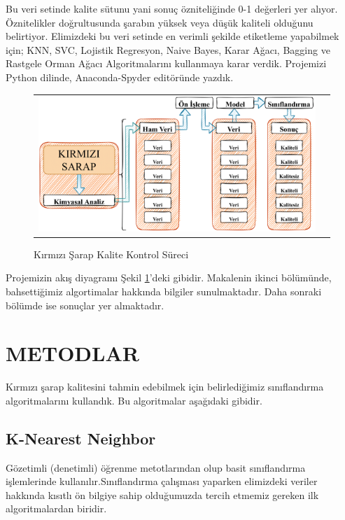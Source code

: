 \documentclass[conference]{IEEEtran}
\begin{document}
\quad Bu veri setinde kalite sütunu yani sonuç özniteliğinde 0-1 değerleri yer alıyor. Öznitelikler doğrultusunda şarabın yüksek veya düşük kaliteli olduğunu belirtiyor. Elimizdeki bu veri setinde en verimli şekilde etiketleme yapabilmek için; KNN, SVC, Lojistik Regresyon, Naive Bayes, Karar Ağacı, Bagging ve Rastgele Orman Ağacı Algoritmalarını kullanmaya karar verdik. Projemizi Python dilinde, Anaconda-Spyder editöründe yazdık.
\pagebreak
\begin{figure}[!h]
	\centering%
	\begin{center}
		\begin{tabular}{cc}%
			\includegraphics[scale=0.2]{pictures/pic_01.png}&%
		\end{tabular}%
	\end{center}
	\caption{Kırmızı Şarap Kalite Kontrol Süreci}%
	\label{fig:01}
\end{figure}

Projemizin akış diyagramı Şekil \ref{fig:01}'deki gibidir. Makalenin ikinci bölümünde, bahsettiğimiz algortimalar hakkında bilgiler sunulmaktadır. Daha sonraki bölümde ise sonuçlar yer almaktadır.


\section{\textbf{METODLAR}}
\quad Kırmızı şarap kalitesini tahmin edebilmek için belirlediğimiz sınıflandırma algoritmalarını kullandık. Bu algoritmalar aşağıdaki gibidir.
\subsection{\textbf{K-Nearest Neighbor}}
\quad Gözetimli (denetimli) öğrenme metotlarından olup  basit sınıflandırma işlemlerinde kullanılır\cite{8}\cite{9}.Sınıflandırma çalışması yaparken elimizdeki veriler hakkında kısıtlı ön bilgiye sahip olduğumuzda tercih etmemiz gereken ilk algoritmalardan biridir\cite{8}.
\end{document}
